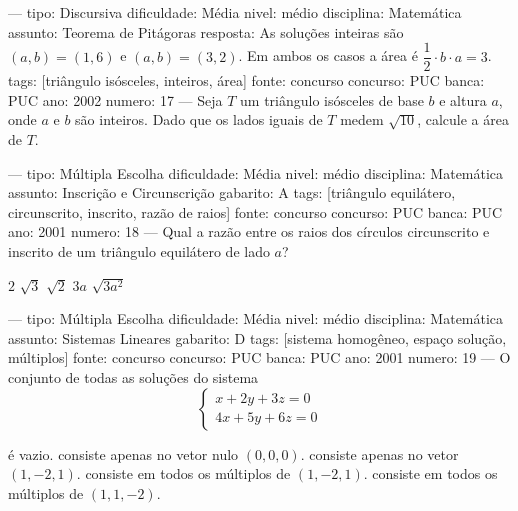 ---
tipo: Discursiva
dificuldade: Média
nivel: médio
disciplina: Matemática
assunto: Teorema de Pitágoras
resposta: As soluções inteiras são $(a, b) = (1, 6)$ e $(a, b) = (3, 2)$. Em ambos os casos a área é $\dfrac{1}{2} \cdot b \cdot a = 3$.
tags: [triângulo isósceles, inteiros, área]
fonte: concurso
concurso: PUC
banca: PUC
ano: 2002
numero: 17
---
\question
Seja $T$ um triângulo isósceles de base $b$ e altura $a$, onde $a$ e $b$ são inteiros. Dado que os lados iguais de $T$ medem $\sqrt{10}$, calcule a área de $T$.

---
tipo: Múltipla Escolha
dificuldade: Média
nivel: médio
disciplina: Matemática
assunto: Inscrição e Circunscrição
gabarito: A
tags: [triângulo equilátero, circunscrito, inscrito, razão de raios]
fonte: concurso
concurso: PUC
banca: PUC
ano: 2001
numero: 18
---
\question
Qual a razão entre os raios dos círculos circunscrito e inscrito de um triângulo equilátero de lado $a$?
\begin{choices}
\CorrectChoice $2$
\choice $\sqrt{3}$
\choice $\sqrt{2}$
\choice $3a$
\choice $\sqrt{3a^2}$
\end{choices}

---
tipo: Múltipla Escolha
dificuldade: Média
nivel: médio
disciplina: Matemática
assunto: Sistemas Lineares
gabarito: D
tags: [sistema homogêneo, espaço solução, múltiplos]
fonte: concurso
concurso: PUC
banca: PUC
ano: 2001
numero: 19
---
\question
O conjunto de todas as soluções do sistema
$$\begin{cases} x + 2y + 3z = 0 \\ 4x + 5y + 6z = 0 \end{cases}$$
\begin{choices}
\choice é vazio.
\choice consiste apenas no vetor nulo $(0, 0, 0)$.
\choice consiste apenas no vetor $(1, -2, 1)$.
\CorrectChoice consiste em todos os múltiplos de $(1, -2, 1)$.
\choice consiste em todos os múltiplos de $(1, 1, -2)$.
\end{choices}
